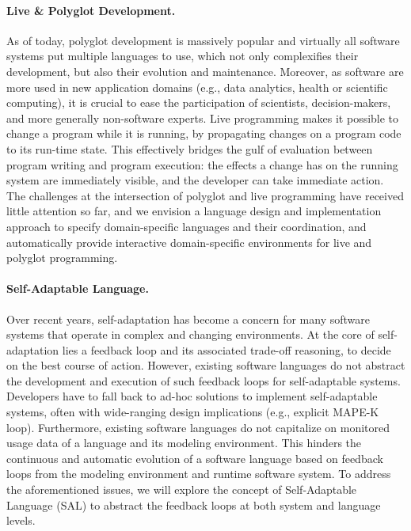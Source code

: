 \paragraph{Live \& Polyglot Development.} As of today, polyglot development is massively popular and virtually all software systems put multiple languages to use, which not only complexifies their development, but also their evolution and maintenance. Moreover, as software are more used in new application domains (e.g., data analytics, health or scientific computing), it is crucial to ease the participation of scientists, decision-makers, and more generally non-software experts. Live programming makes it possible to change a program while it is running, by propagating changes on a program code to its run-time state. This effectively bridges the gulf of evaluation between program writing and program execution: the effects a change has on the running system are immediately visible, and the developer can take immediate action. The challenges at the intersection of polyglot and live programming have received little attention so far, and we envision a language design and implementation approach to specify domain-specific languages and their coordination, and automatically provide interactive domain-specific environments for live and polyglot programming.

\paragraph{Self-Adaptable Language.} Over recent years, self-adaptation has become a concern for many software systems that operate in complex and changing environments. At the core of self-adaptation lies a feedback loop and its associated trade-off reasoning, to decide on the best course of action. However, existing software languages do not abstract the development and execution of such feedback loops for self-adaptable systems. Developers have to fall back to ad-hoc solutions to implement self-adaptable systems, often with wide-ranging design implications (e.g., explicit MAPE-K loop). Furthermore, existing software languages do not capitalize on monitored usage data of a language and its modeling environment. This hinders the continuous and automatic evolution of a software language based on feedback loops from the modeling environment and runtime software system. To address the aforementioned issues, we will explore the concept of Self-Adaptable Language (SAL) to abstract the feedback loops at both system and language levels.

